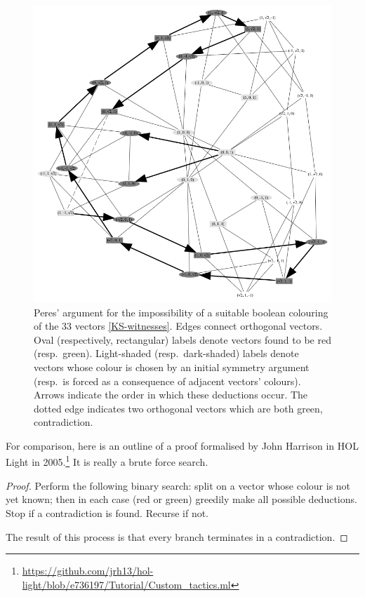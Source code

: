 \documentclass[runningheads]{llncs}
\begin{document}
\begin{figure}
  \centering
\includegraphics*[scale=0.25]{ks-chase.png}
\caption{Peres' argument \cite{Per91} for the impossibility of a suitable boolean colouring of the 33 vectors \cref{KS-witnesses}.
Edges connect orthogonal vectors.
Oval (respectively, rectangular) labels denote vectors found to be red (resp.\ green).
Light-shaded (resp.\ dark-shaded) labels denote vectors whose colour is chosen by an initial symmetry argument
(resp.\ is forced as a consequence of adjacent vectors' colours).
Arrows indicate the order in which these deductions occur.
The dotted edge indicates two orthogonal vectors which are both green, contradiction.}
\label{fig:peres-graph}
\end{figure}



For comparison, here is an outline of a proof formalised by John Harrison in HOL Light in 2005.\footnote{
  \url{https://github.com/jrh13/hol-light/blob/e736197/Tutorial/Custom_tactics.ml}}
It is really a brute force search.

\begin{proof}
Perform the following binary search:
split on a vector whose colour is not yet known;
then in each case (red or green) greedily make all possible deductions.
Stop if a contradiction is found. Recurse if not.

The result of this process is that every branch terminates in a contradiction.
\end{proof}
\end{document}
